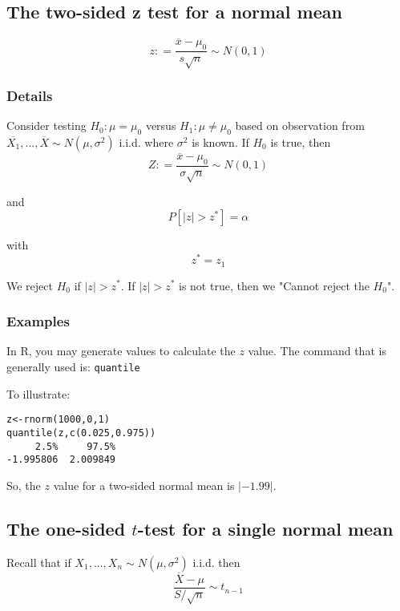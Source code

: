 \documentclass[12pt,a4paper]{article}
\theoremstyle{regla}
\theoremstyle{remark}
\theoremstyle{definition}
\theoremstyle{nonumberbreak}
\begin{document}
\subsection{The two-sided z test for a normal mean}
\begin{fbox}
\begin{minipage}{0.97\textwidth}
$$z: =\frac{\overline{x}-\mu_0}{s\sqrt{n}} \sim N(0,1)$$
\end{minipage}
\end{fbox}
\subsubsection{Details}
Consider testing $H_0: \mu=\mu_0$ versus $H_1: \mu \ne \mu_0$ based on observation from $\overline{X_1},..., \overline{X} \sim N(\mu, \sigma^2)$  i.i.d. where $\sigma^2$ is known.  If $H_0$ is true, then
$$Z: = \frac{\overline{x}-\mu_0}{\sigma \sqrt{n}} \sim N(0,1)$$

and
$$P[|z| > z^\ast] = \alpha$$

with $$z^\ast = z_{1}$$

We reject $H_0$ if $|z| > z^\ast$. If $|z| > z^\ast$ is not true, then we "Cannot reject the $H_0$".




 
\subsubsection{Examples}
\begin{xmpl}

In R, you may generate values to calculate the $z$ value. The command that is generally used is: \texttt {quantile}  

To illustrate: 

\begin{lstlisting}
z<-rnorm(1000,0,1)
quantile(z,c(0.025,0.975))
     2.5%     97.5% 
-1.995806  2.009849 
\end{lstlisting}

So, the $z$ value for a two-sided normal mean is $\left |-1.99 \right |$.  
\end{xmpl}

\subsection{The one-sided $t$-test for a single normal mean}
\begin{fbox}
\begin{minipage}{0.97\textwidth}
Recall that if $X_1,...,X_n \sim N(\mu,\sigma^2)$ i.i.d. then $$\frac{\overline{X}-\mu}{S/\sqrt{n}}\sim t_{n-1}$$
\end{minipage}
\end{fbox}
\end{document}
